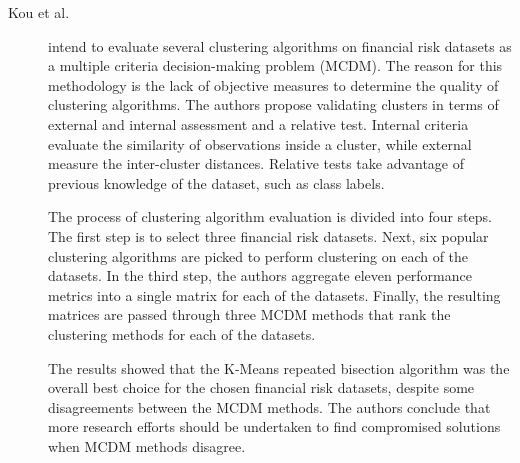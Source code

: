 \begin{description}
    \item[Kou et al.]\cite{Kou20141} intend to evaluate several clustering algorithms on financial risk datasets as a multiple criteria decision-making problem (MCDM). The reason for this methodology is the lack of objective measures to determine the quality of clustering algorithms. The authors propose validating clusters in terms of external and internal assessment and a relative test. Internal criteria evaluate the similarity of observations inside a cluster, while external measure the inter-cluster distances. Relative tests take advantage of previous knowledge of the dataset, such as class labels.
    
    The process of clustering algorithm evaluation is divided into four steps. The first step is to select three financial risk datasets. Next, six popular clustering algorithms are picked to perform clustering on each of the datasets. In the third step, the authors aggregate eleven performance metrics into a single matrix for each of the datasets. Finally, the resulting matrices are passed through three MCDM methods that rank the clustering methods for each of the datasets.

    The results showed that the K-Means repeated bisection algorithm was the overall best choice for the chosen financial risk datasets, despite some disagreements between the MCDM methods. The authors conclude that more research efforts should be undertaken to find compromised solutions when MCDM methods disagree.
\end{description}


